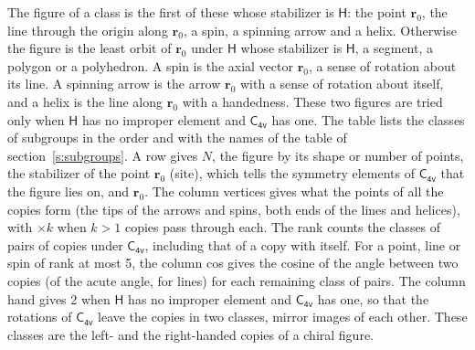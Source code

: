 \documentclass[10pt,a4paper]{article}
\numberwithin{equation}{section}
\newcommand{\grp}[1]{\mathsf{#1}}
\newcommand{\pointr}{\mathbf{r}}
\begin{document}
\leavevmode\label{n:head.figure}The figure of a class is the first of these whose stabilizer is $\grp{H}$: the point $\pointr_0$, the line through the origin along $\pointr_0$, a spin, a spinning arrow and a helix. Otherwise the figure is the least orbit of $\pointr_0$ under $\grp{H}$ whose stabilizer is $\grp{H}$, a segment, a polygon or a polyhedron. A spin is the axial vector $\pointr_0$, a sense of rotation about its line. A spinning arrow is the arrow $\pointr_0$ with a sense of rotation about itself, and a helix is the line along $\pointr_0$ with a handedness. These two figures are tried only when $\grp{H}$ has no improper element and $\grp{C_{4v}}$ has one. The table lists the classes of subgroups in the order and with the names of the table of section~\ref{s:subgroups}. \label{n:head.site}A row gives $N$, the figure by its shape or number of points, the stabilizer of the point $\pointr_0$ (site), which tells the symmetry elements of $\grp{C_{4v}}$ that the figure lies on, and $\pointr_0$. \label{n:head.vertices}The column vertices gives what the points of all the copies form (the tips of the arrows and spins, both ends of the lines and helices), with ${\times}k$ when $k > 1$ copies pass through each. \label{n:head.rank}The rank counts the classes of pairs of copies under $\grp{C_{4v}}$, including that of a copy with itself. \label{n:head.cos}For a point, line or spin of rank at most 5, the column cos gives the cosine of the angle between two copies (of the acute angle, for lines) for each remaining class of pairs. \label{n:head.hand}The column hand gives 2 when $\grp{H}$ has no improper element and $\grp{C_{4v}}$ has one, so that the rotations of $\grp{C_{4v}}$ leave the copies in two classes, mirror images of each other. These classes are the left- and the right-handed copies of a chiral figure.
\end{document}
